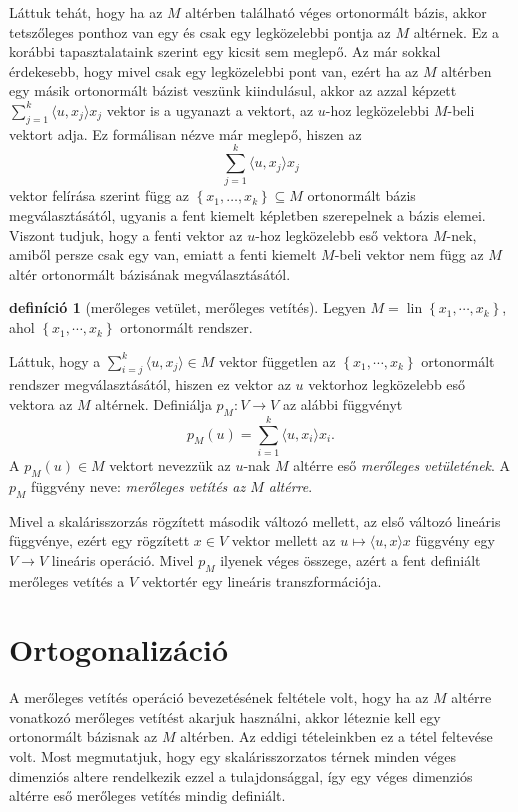 \documentclass[9pt, a4paper, showtrims]{memoir}
\theoremstyle{plain}
\theoremstyle{remark}
\theoremstyle{definition}
\newtheorem{definition}[proposition]{definíció}
\DeclareMathOperator{\lin}{lin}
\newcommand{\ip}[2]{\langle#1,#2\rangle}
\begin{document}
Láttuk tehát, hogy ha az $M$ altérben található véges ortonormált bázis,
akkor tetszőleges ponthoz van egy és csak egy legközelebbi pontja az $M$ altérnek.
Ez a korábbi tapasztalataink szerint egy kicsit sem meglepő.
Az már sokkal érdekesebb, hogy mivel csak egy legközelebbi pont van, ezért
ha az $M$ altérben egy másik ortonormált bázist veszünk kiindulásul, akkor az azzal képzett
$\sum_{j=1}^k\ip{u}{x_j}x_j$ vektor is a ugyanazt a vektort, az $u$-hoz legközelebbi $M$-beli vektort adja.
Ez formálisan nézve már meglepő, hiszen az
\[
	\sum_{j=1}^k\ip{u}{x_j}x_j
\]
vektor felírása szerint függ az $\left\{ x_1,\ldots,x_k \right\}\subseteq M$ ortonormált bázis megválasztásától,
ugyanis a fent kiemelt képletben szerepelnek a bázis elemei.
Viszont tudjuk, hogy a fenti vektor az $u$-hoz legközelebb eső vektora $M$-nek, amiből persze csak egy van,
emiatt a fenti kiemelt $M$-beli vektor nem függ az $M$ altér ortonormált bázisának megválasztásától.
\begin{definition}[merőleges vetület, merőleges vetítés]
	Legyen $M=\lin\left\{ x_1,\cdots,x_k \right\}$,
	ahol $\left\{ x_1,\cdots,x_k \right\}$ ortonormált rendszer.

	Láttuk, hogy a
	$\sum_{i=j}^k\ip{u}{x_j}\in M$ vektor független
	az $\left\{ x_1,\cdots,x_k \right\}$ ortonormált rendszer megválasztásától,
	hiszen ez vektor az $u$ vektorhoz legközelebb eső vektora az $M$ altérnek.
	Definiálja $p_M:V\to V$ az alábbi függvényt
	\[
		p_M\left( u \right)=
		\sum_{i=1}^k\ip{u}{x_i}x_i.
	\]
	A $p_M\left( u \right)\in M$ vektort nevezzük az $u$-nak $M$ altérre eső \emph{merőleges vetületének}.
	A $p_M$ függvény neve: \emph{merőleges vetítés az $M$ altérre}.
\end{definition}
Mivel a skalárisszorzás rögzített második változó mellett,
az első változó lineáris függvénye,
ezért egy rögzített $x\in V$ vektor mellett az $u\mapsto\ip{u}{x}x$ függvény egy $V\to V$ lineáris operáció.
Mivel $p_M$ ilyenek véges összege, azért a fent definiált merőleges vetítés a $V$ vektortér egy lineáris transzformációja.
\section{Ortogonalizáció}
A merőleges vetítés operáció bevezetésének feltétele volt, hogy ha az $M$ altérre vonatkozó
merőleges vetítést akarjuk használni, akkor léteznie kell egy ortonormált bázisnak az $M$ altérben.
Az eddigi tételeinkben ez a tétel feltevése volt.
Most megmutatjuk, hogy egy skalárisszorzatos térnek minden véges dimenziós altere rendelkezik ezzel a
tulajdonsággal, így egy véges dimenziós altérre eső merőleges vetítés mindig definiált.
\end{document}
